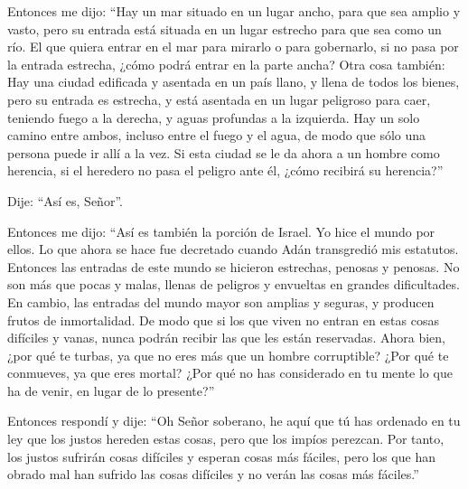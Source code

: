 Entonces me dijo: ``Hay un mar situado en un lugar ancho, para que sea
amplio y vasto,  pero su entrada está situada en un lugar
estrecho para que sea como un río.  El que quiera entrar
en el mar para mirarlo o para gobernarlo, si no pasa por la entrada
estrecha, ¿cómo podrá entrar en la parte ancha?  Otra cosa
también: Hay una ciudad edificada y asentada en un país llano, y llena
de todos los bienes,  pero su entrada es estrecha, y está
asentada en un lugar peligroso para caer, teniendo fuego a la derecha, y
aguas profundas a la izquierda.  Hay un solo camino entre
ambos, incluso entre el fuego y el agua, de modo que sólo una persona
puede ir allí a la vez.  Si esta ciudad se le da ahora a
un hombre como herencia, si el heredero no pasa el peligro ante él,
¿cómo recibirá su herencia?''

 Dije: ``Así es, Señor''.

Entonces me dijo: ``Así es también la porción de Israel. 
Yo hice el mundo por ellos. Lo que ahora se hace fue decretado cuando
Adán transgredió mis estatutos.  Entonces las entradas de
este mundo se hicieron estrechas, penosas y penosas. No son más que
pocas y malas, llenas de peligros y envueltas en grandes dificultades.
 En cambio, las entradas del mundo mayor son amplias y
seguras, y producen frutos de inmortalidad.  De modo que
si los que viven no entran en estas cosas difíciles y vanas, nunca
podrán recibir las que les están reservadas.  Ahora bien,
¿por qué te turbas, ya que no eres más que un hombre corruptible? ¿Por
qué te conmueves, ya que eres mortal?  ¿Por qué no has
considerado en tu mente lo que ha de venir, en lugar de lo presente?''

 Entonces respondí y dije: ``Oh Señor soberano, he aquí
que tú has ordenado en tu ley que los justos hereden estas cosas, pero
que los impíos perezcan.  Por tanto, los justos sufrirán
cosas difíciles y esperan cosas más fáciles, pero los que han obrado mal
han sufrido las cosas difíciles y no verán las cosas más fáciles.''

